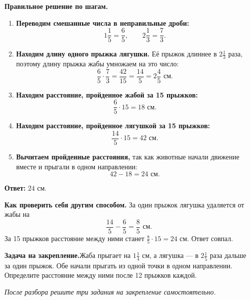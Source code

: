 \documentclass[11pt,a4paper]{article}
\newcommand{\practice}{\vspace{4pt}\textbf{\color{accent} Задача на закрепление.}\quad}
\begin{document}
\textbf{Правильное решение по шагам.}
\begin{enumerate}
\item \textbf{Переводим смешанные числа в неправильные дроби:}
\[
1\frac15=\frac65,\qquad 2\frac13=\frac73.
\]
\item \textbf{Находим длину одного прыжка лягушки.} Её прыжок длиннее в \(2\frac13\) раза, поэтому длину прыжка жабы умножаем на это число:
\[
\frac65\cdot\frac73=\frac{42}{15}=\frac{14}{5}=2\frac45\text{ см}.
\]
\item \textbf{Находим расстояние, пройденное жабой за 15 прыжков:}
\[
\frac65\cdot15=18\text{ см}.
\]
\item \textbf{Находим расстояние, пройденное лягушкой за 15 прыжков:}
\[
\frac{14}{5}\cdot15=42\text{ см}.
\]
\item \textbf{Вычитаем пройденные расстояния,} так как животные начали движение вместе и прыгали в одном направлении:
\[
42-18=24\text{ см}.
\]
\end{enumerate}
\textbf{Ответ:} \(\boxed{24\text{ см}}\).

\textbf{Как проверить себя другим способом.} За один прыжок лягушка удаляется от жабы на
\[
\frac{14}{5}-\frac65=\frac85\text{ см}.
\]
За 15 прыжков расстояние между ними станет \(\frac85\cdot15=24\) см. Ответ совпал.

\practice Жаба прыгает на \(1\frac14\) см, а лягушка --- в \(2\frac15\) раза дальше за один прыжок. Обе начали прыгать из одной точки в одном направлении. Определите расстояние между ними после 12 прыжков каждой.

\vfill
\begin{center}\small\color{ink} \textit{После разбора решите три задания на закрепление самостоятельно.}\end{center}
\end{document}
